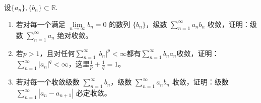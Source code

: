 \documentclass[../../main.tex]{subfiles}%
\begin{document}
\begin{example}
设$\{ a_n \},\{ b_n \} \subset \mathbb{R}$.
\begin{enumerate}[(1)]
\item 若对每一个满足 $\lim\limits_{n\to\infty} b_n = 0$ 的数列 $\{b_n\}$，级数 $\sum\limits_{n=1}^{\infty} a_n b_n$ 收敛，证明：级数 $\sum\limits_{n=1}^{\infty} a_n$ 绝对收敛。

\item 若$p > 1$，且对任何$\sum_{n=1}^{\infty} |b_n|^p < \infty$都有$\sum_{n=1}^{\infty} b_n a_n$收敛，证明：$\sum_{n=1}^{\infty} |a_n|^q < \infty$，这里$\frac{1}{p} + \frac{1}{q} = 1$。

\item 若对每一个收敛级数 $\sum\limits_{n=1}^{\infty} b_n$，级数 $\sum\limits_{n=1}^{\infty} a_n b_n$ 收敛，证明：级数 $\sum\limits_{n=1}^{\infty} |a_n - a_{n+1}|$ 必定收敛。
\end{enumerate}
\end{example}
\end{document}
